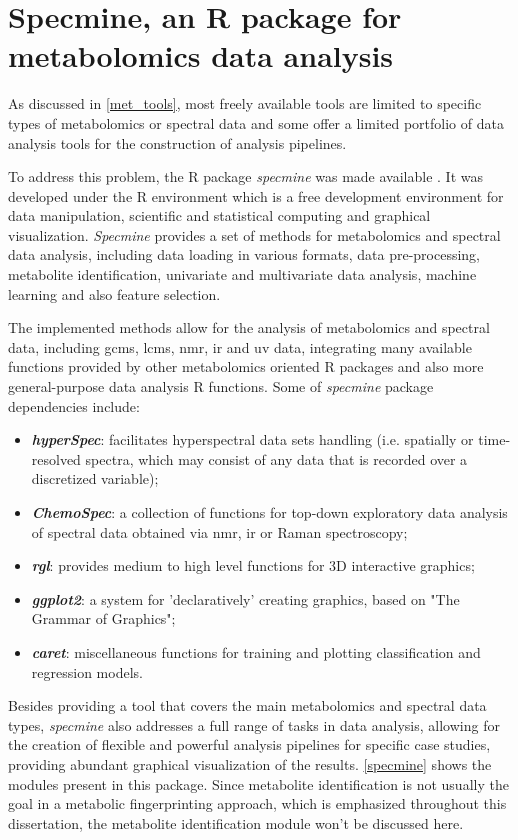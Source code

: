 
\section{Specmine, an R package for metabolomics data analysis} \label{specmine_chapter}

As discussed in \autoref{met_tools}, most freely available tools are limited to specific types of metabolomics or spectral data and some offer a limited portfolio of data analysis tools for the construction of analysis pipelines. 

To address this problem, the R package \textit{specmine} was made available \citep{costa2016r}. It was developed under the R environment which is a free development environment for data manipulation, scientific and statistical computing and graphical visualization. \textit{Specmine} provides a set of methods for metabolomics and spectral data analysis, including data loading in various formats, data pre-processing, metabolite identification, univariate and multivariate data analysis, machine learning and also feature selection. 

The implemented methods allow for the analysis of metabolomics and spectral data, including \gls{gcms}, \gls{lcms}, \gls{nmr}, \gls{ir} and \gls{uv} data, integrating many available functions provided by other metabolomics oriented R packages and also more general-purpose data analysis R functions. Some of \textit{specmine} package dependencies include:

\begin{itemize}
	\item \textit{\textbf{hyperSpec}}: facilitates hyperspectral data sets handling (i.e. spatially or time-resolved spectra, which may consist of any data that is recorded over a discretized variable);
	\item \textit{\textbf{ChemoSpec}}: a collection of functions for top-down exploratory data analysis of spectral data obtained via \gls{nmr}, \gls{ir} or Raman spectroscopy;
	\item \textit{\textbf{rgl}}: provides medium to high level functions for 3D interactive graphics;
	\item \textit{\textbf{ggplot2}}: a system for 'declaratively' creating graphics, based on "The Grammar of Graphics";
	\item \textit{\textbf{caret}}: miscellaneous functions for training and plotting classification and regression models.
\end{itemize}

Besides providing a tool that covers the main metabolomics and spectral data types, \textit{specmine} also addresses a full range of tasks in data analysis, allowing for the creation of flexible and powerful analysis pipelines for specific case studies, providing abundant graphical visualization of the results. \autoref{specmine} shows the modules present in this package. Since metabolite identification is not usually the goal in a metabolic fingerprinting approach, which is emphasized throughout this dissertation, the metabolite identification module won't be discussed here.


